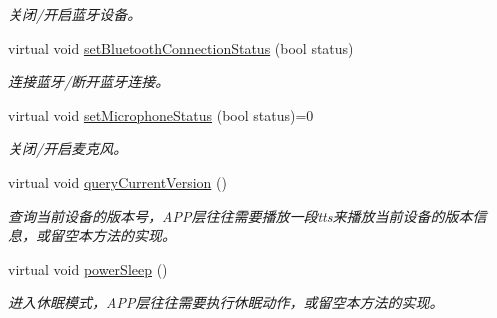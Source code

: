 \begin{DoxyCompactItemize}
\begin{DoxyCompactList}\small\item\em 关闭/开启蓝牙设备。 \end{DoxyCompactList}\item 
virtual void \hyperlink{classduerOSDcsSDK_1_1sdkInterfaces_1_1ApplicationImplementation_a28e429d6ff9ee0f6ba70770b39007ca1}{set\+Bluetooth\+Connection\+Status} (bool status)
\begin{DoxyCompactList}\small\item\em 连接蓝牙/断开蓝牙连接。 \end{DoxyCompactList}\item 
virtual void \hyperlink{classduerOSDcsSDK_1_1sdkInterfaces_1_1ApplicationImplementation_af1dc79663449f715e08c35757d11bfab}{set\+Microphone\+Status} (bool status)=0
\begin{DoxyCompactList}\small\item\em 关闭/开启麦克风。 \end{DoxyCompactList}\item 
\mbox{\label{classduerOSDcsSDK_1_1sdkInterfaces_1_1ApplicationImplementation_ab3c134187fc2961692b883f1121516e3}} 
virtual void \hyperlink{classduerOSDcsSDK_1_1sdkInterfaces_1_1ApplicationImplementation_ab3c134187fc2961692b883f1121516e3}{query\+Current\+Version} ()
\begin{DoxyCompactList}\small\item\em 查询当前设备的版本号，\+A\+P\+P层往往需要播放一段tts来播放当前设备的版本信息，或留空本方法的实现。 \end{DoxyCompactList}\item 
\mbox{\label{classduerOSDcsSDK_1_1sdkInterfaces_1_1ApplicationImplementation_aacb518c857399cc47c6ad005ebfc00fd}} 
virtual void \hyperlink{classduerOSDcsSDK_1_1sdkInterfaces_1_1ApplicationImplementation_aacb518c857399cc47c6ad005ebfc00fd}{power\+Sleep} ()
\begin{DoxyCompactList}\small\item\em 进入休眠模式，\+A\+P\+P层往往需要执行休眠动作，或留空本方法的实现。 \end{DoxyCompactList}\item 
\mbox{\label{classduerOSDcsSDK_1_1sdkInterfaces_1_1ApplicationImplementation_a200b09dedd7dced2e41d8980901226e3}} 

\end{DoxyCompactItemize}
